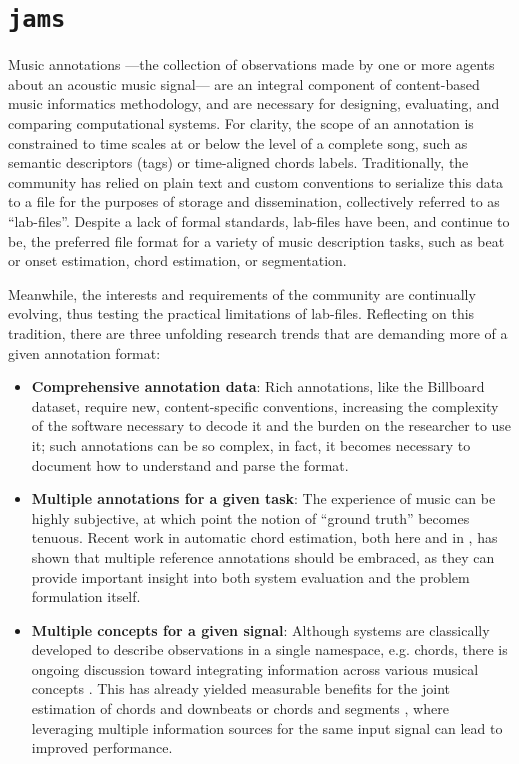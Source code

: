 \section{\texttt{jams}}
\label{sec:jams}

Music annotations ---the collection of observations made by one or more agents about an acoustic music signal--- are an integral component of content-based music informatics methodology, and are necessary for designing, evaluating, and comparing computational systems.
For clarity, the scope of an annotation is constrained to time scales at or below the level of a complete song, such as semantic descriptors (tags) or time-aligned chords labels.
Traditionally, the community has relied on plain text and custom conventions to serialize this data to a file for the purposes of storage and dissemination, collectively referred to as ``lab-files''.
Despite a lack of formal standards, lab-files have been, and continue to be, the preferred file format for a variety of music description tasks, such as beat or onset estimation, chord estimation, or segmentation.

Meanwhile, the interests and requirements of the community are continually evolving, thus testing the practical limitations of lab-files.
Reflecting on this tradition, there are three unfolding research trends that are demanding more of a given annotation format:

\begin{itemize}
\item \textbf{Comprehensive annotation data}:
Rich annotations, like the Billboard dataset\cite{Burgoyne2011expert}, require new, content-specific conventions, increasing the complexity of the software necessary to decode it and the burden on the researcher to use it; such annotations can be so complex, in fact, it becomes necessary to document how to understand and parse the format\cite{De2012parsing}.

\item \textbf{Multiple annotations for a given task}:
The experience of music can be highly subjective, at which point the notion of ``ground truth'' becomes tenuous.
Recent work in automatic chord estimation, both here and in \cite{ni2013understanding}, has shown that multiple reference annotations should be embraced, as they can provide important insight into both system evaluation and the problem formulation itself.

\item \textbf{Multiple concepts for a given signal}:
Although systems are classically developed to describe observations in a single namespace, e.g. chords, there is ongoing discussion toward integrating information across various musical concepts \cite{vincent2010roadmap}.
This has already yielded measurable benefits for the joint estimation of chords and downbeats \cite{papadopoulos2011joint} or chords and segments \cite{mauch2009using}, where leveraging multiple information sources for the same input signal can lead to improved performance.
\end{itemize}


